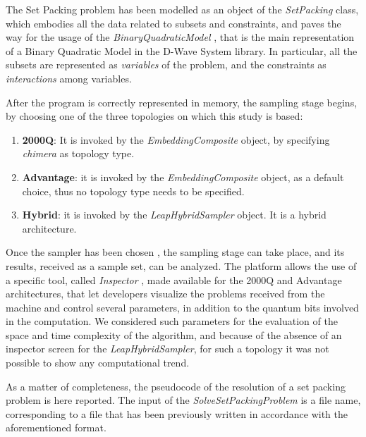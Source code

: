 \documentclass[oneside,a4paper]{article}
\begin{document}
The Set Packing problem has been modelled as an object of the \textit{SetPacking} class, which embodies all the data related to subsets and constraints, and paves the way for the usage of the \textit{BinaryQuadraticModel} \cite{WebSite10}, that is the main representation of a Binary Quadratic Model in the D-Wave System library. In particular, all the subsets are represented as \textit{variables} of the problem, and the constraints as \textit{interactions} among variables.

After the program is correctly represented in memory, the sampling stage begins, by choosing one of the three topologies on which this study is based:
\begin{enumerate}
    \item \textbf{2000Q}: It is invoked by the \textit{EmbeddingComposite} object, by specifying \textit{chimera} as topology type.
    \item \textbf{Advantage}: it is invoked by the \textit{EmbeddingComposite} object, as a default choice, thus no topology type needs to be specified.
    \item \textbf{Hybrid}: it is invoked by the \textit{LeapHybridSampler} object. It is a hybrid architecture.
\end{enumerate}

Once the sampler has been chosen \cite{WebSite11}, the sampling stage can take place, and its results, received as a sample set, can be analyzed. The platform allows the use of a specific tool, called \textit{Inspector} \cite{WebSite12}, made available for the 2000Q and Advantage architectures, that let developers visualize the problems received from the machine and control several parameters, in addition to the quantum bits involved in the computation. We considered such parameters for the evaluation of the space and time complexity of the algorithm, and because of the absence of an inspector screen for the \textit{LeapHybridSampler}, for such a topology it was not possible to show any computational trend.

As a matter of completeness, the pseudocode of the resolution of a set packing problem is here reported. The input of the \textit{SolveSetPackingProblem} is a file name, corresponding to a file that has been previously written in accordance with the aforementioned format.
\end{document}
